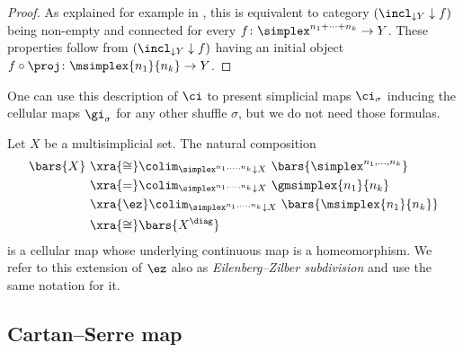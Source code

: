 \begin{proof}
	As explained for example in \cite[]{riehl2014categorical}, this is equivalent to category $(\incl_{\downarrow Y} \downarrow f)$ being non-empty and connected for every $f \colon \simplex^{n_1+\dots+n_k} \to Y$.
	These properties follow from $(\incl_{\downarrow Y} \downarrow f)$ having an initial object $f \circ \proj \colon \msimplex{n_1}{n_k} \to Y$.
\end{proof}


\newpage

One can use this description of $\ci$ to present simplicial maps $\ci_\sigma$ inducing the cellular maps $\gi_\sigma$ for any other shuffle $\sigma$, but we do not need those formulas.

Let $X$ be a multisimplicial set.
The natural composition
\begin{align*}
	\bars{X} \ &\xra{\cong}
	\colim_{\simplex^{n_1,\dots,n_k} \downarrow X} \ \bars{\simplex^{n_1,\dots,n_k}} \\ &\xra{=}
	\colim_{\simplex^{n_1,\dots,n_k} \downarrow X} \ \gmsimplex{n_1}{n_k} \\ &\xra{\ez}
	\colim_{\simplex^{n_1,\dots,n_k} \downarrow X} \ \bars{\msimplex{n_1}{n_k}} \\ &\xra{\cong}
	\bars{X^{\diag}}
\end{align*}
is a cellular map whose underlying continuous map is a homeomorphism.
We refer to this extension of $\ez$ also as \textit{Eilenberg--Zilber subdivision} and use the same notation for it.

\subsection{Cartan--Serre map} \label{ss:cartan-serre map}

